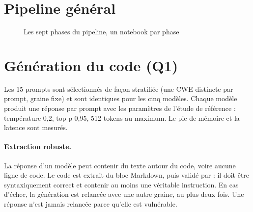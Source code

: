 \documentclass[11pt,a4paper,oneside]{report}
\newcommand{\code}[1]{\texttt{\detokenize{#1}}}
\begin{document}
\section{Pipeline général}
\begin{figure}[H]
\centering
{}
\caption{Les sept phases du pipeline, un notebook par phase}
\label{fig:pipeline}
\end{figure}

\section{Génération du code (Q1)}
Les 15 prompts sont sélectionnés de façon stratifiée (une CWE distincte par prompt, graine fixe) et sont identiques pour les cinq modèles. Chaque modèle produit une réponse par prompt avec les paramètres de l'étude de référence : température 0,2, top-p 0,95, 512 tokens au maximum. Le pic de mémoire et la latence sont mesurés.

\paragraph{Extraction robuste.} La réponse d'un modèle peut contenir du texte autour du code, voire aucune ligne de code. Le code est extrait du bloc Markdown, puis validé par \code{ast.parse} : il doit être syntaxiquement correct et contenir au moins une véritable instruction. En cas d'échec, la génération est relancée avec une autre graine, au plus deux fois. Une réponse n'est jamais relancée parce qu'elle est vulnérable.
\end{document}
